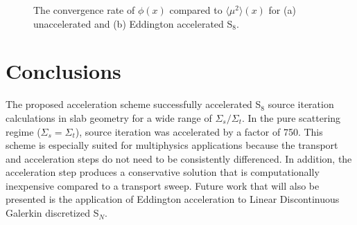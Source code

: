 \documentclass[11 pt]{article}
\newcommand{\SN}{S$_N$\xspace}
\newcommand{\edd}{\langle \mu^2 \rangle}
\begin{document}
\begin{figure}
\begin{subfigure}{.49\textwidth}
			\caption{}
			\label{fig:conv_edd}
		\end{subfigure}
		\caption{The convergence rate of $\phi(x)$ compared to $\edd(x)$ for (a) unaccelerated and (b) Eddington accelerated S$_8$. }
	\end{figure}


\section{Conclusions}
	The proposed acceleration scheme successfully accelerated S$_8$ source iteration calculations in slab geometry for a wide range of $\Sigma_s/\Sigma_t$. In the pure scattering regime ($\Sigma_s = \Sigma_t$), source iteration was accelerated by a factor of 750. This scheme is especially suited for multiphysics applications because the transport and acceleration steps do not need to be consistently differenced. In addition, the acceleration step produces a conservative solution that is computationally inexpensive compared to a transport sweep. Future work that will also be presented is the application of Eddington acceleration to Linear Discontinuous Galerkin discretized \SN. 


 

\printglossaries
\end{document}
